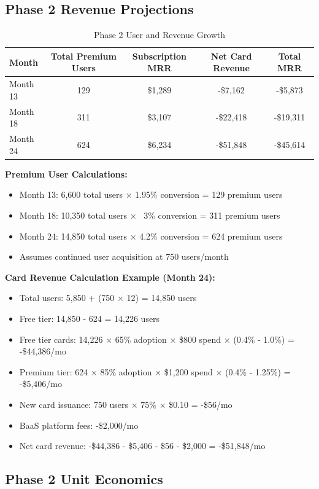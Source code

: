 \documentclass[11pt,letterpaper]{article}
\begin{document}
\subsection{Phase 2 Revenue Projections}

\begin{table}[h]
\centering
\caption{Phase 2 User and Revenue Growth}
\begin{tabular}{|l|c|c|c|c|}
\hline
\textbf{Month} & \textbf{Total Premium Users} & \textbf{Subscription MRR} & \textbf{Net Card Revenue} & \textbf{Total MRR} \\
\hline
Month 13 & 129 & \$1,289 & -\$7,162 & -\$5,873 \\
Month 18 & 311 & \$3,107 & -\$22,418 & -\$19,311 \\
Month 24 & 624 & \$6,234 & -\$51,848 & -\$45,614 \\
\hline
\end{tabular}
\end{table}

\textbf{Premium User Calculations:}
\begin{itemize}
\item Month 13: 6,600 total users × 1.95\% conversion = 129 premium users
\item Month 18: 10,350 total users × ~3\% conversion = 311 premium users
\item Month 24: 14,850 total users × 4.2\% conversion = 624 premium users
\item Assumes continued user acquisition at 750 users/month
\end{itemize}

\textbf{Card Revenue Calculation Example (Month 24):}
\begin{itemize}
\item Total users: 5,850 + (750 × 12) = 14,850 users
\item Free tier: 14,850 - 624 = 14,226 users
\item Free tier cards: 14,226 × 65\% adoption × \$800 spend × (0.4\% - 1.0\%) = -\$44,386/mo
\item Premium tier: 624 × 85\% adoption × \$1,200 spend × (0.4\% - 1.25\%) = -\$5,406/mo
\item New card issuance: 750 users × 75\% × \$0.10 = -\$56/mo
\item BaaS platform fees: -\$2,000/mo
\item Net card revenue: -\$44,386 - \$5,406 - \$56 - \$2,000 = -\$51,848/mo
\end{itemize}

\subsection{Phase 2 Unit Economics}
\end{document}
